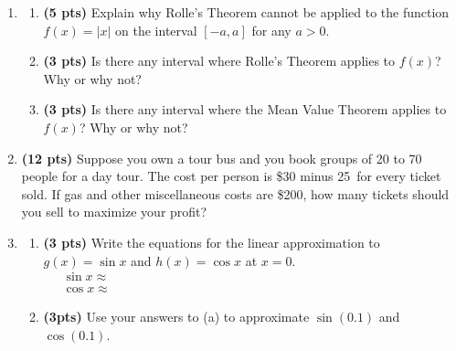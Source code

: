 \documentclass[12pt]{article}
\begin{document}
\begin{enumerate}[1.]

\newpage 

\item %
\begin{enumerate}\item {\bf(5 pts)} Explain why Rolle's Theorem cannot be applied to the function $f(x)=|x|$ on the interval $[-a,a]$ for any $a>0$.
\vspace{5pc}

\item {\bf(3 pts)} Is there any interval where Rolle's Theorem applies to $f(x)$?  Why or why not?
\vspace{5pc}

\item {\bf(3 pts)} Is there any interval where the Mean Value Theorem applies to $f(x)$?  Why or why not?
\vspace{5pc}
\end{enumerate}

\item %
{\bf(12 pts)} Suppose you own a tour bus and you book groups of 20 to 70 people for a day tour.  The cost per person is \$30 minus 25\textcent\ for every ticket sold.  If gas and other miscellaneous costs are \$200, how many tickets should you sell to maximize your profit?
\vspace{20pc}

%	

\newpage
\item %
	\begin{enumerate}	\item {\bf(3 pts)} Write the equations for the linear approximation to $g(x)=\sin x$ and $h(x)=\cos x$ at $x=0$.
	\begin{align*}
	\sin x \approx & \hspace{300pt}\\[0.5pc]
	\cos x \approx &	
	\end{align*}
	\vspace{12pc}
	\item {\bf(3pts)} Use your answers to (a) to approximate $\sin{(0.1)}$ and $\cos{(0.1)}$.


\end{enumerate}
\end{enumerate}
\end{document}
